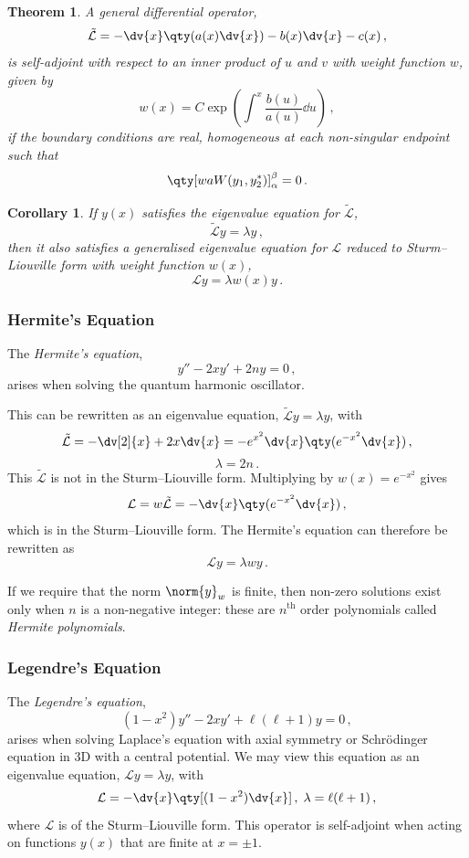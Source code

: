 \documentclass{article}
\theoremstyle{plain}\theoremheaderfont{\normalfont\itshape}\theorembodyfont{\rmfamily}\theoremseparator{.}\newtheorem*{rem}{Remark}\newtheorem*{ex}{Example}\newtheorem*{proof}{Proof}\newtheorem*{altp}{Alternative proof}
\theoremstyle{plain}\theoremheaderfont{\normalfont\bfseries}\theorembodyfont{\rmfamily}\theoremseparator{.}\newtheorem{thm}{Theorem}[section]\newtheorem{lem}[thm]{Lemma}\newtheorem{prop}[thm]{Proposition}\newtheorem*{cor}{Corollary}\newtheorem{defn}[thm]{Definition}\newtheorem{clm}[thm]{Claim}\newtheorem{clminproof}{Claim}
\theoremstyle{break}\theoremheaderfont{\normalfont\itshape}\theorembodyfont{\rmfamily}\theoremseparator{.\medskip}\newtheorem*{proofskip}{Proof}\newtheorem*{exs}{Examples}\newtheorem*{rems}{Remarks}
\theoremstyle{break}\theoremheaderfont{\normalfont\bfseries}\theorembodyfont{\rmfamily}\theoremseparator{.\medskip}\newtheorem{lemskip}[thm]{Lemma}\newtheorem{defnskip}[thm]{Definition}\newtheorem{propskip}[thm]{Proposition}\newtheorem{thmskip}[thm]{Theorem}
\numberwithin{equation}{section}
\begin{document}
	\begin{thm}
		A general differential operator,
		\[\tilde{\mathcal{L}}=-\dv{x}\qty(a(x)\dv{x})-b(x)\dv{x}-c(x)\,,\]
		is self-adjoint with respect to an inner product of \(u\) and \(v\) with weight function \(w\), given by
		\[w(x)=C\exp(\int^x \frac{b(u)}{a(u)}\dd{u})\,,\]
		if the boundary conditions are real, homogeneous at each non-singular endpoint such that
		\[\qty[waW(y_1,y_2^*)]_\alpha^\beta=0\,.\]
	\end{thm}

	\begin{cor}
		If \(y(x)\) satisfies the eigenvalue equation for \(\tilde{\mathcal{L}}\),
		\[\tilde{\mathcal{L}}y=\lambda y\,,\]
		then it also satisfies a generalised eigenvalue equation for \(\mathcal{L}\) reduced to Sturm--Liouville form with weight function \(w(x)\),
		\[\mathcal{L}y=\lambda w(x)y\,.\]
	\end{cor}
	\subsubsection{Hermite's Equation}
	The \textit{Hermite's equation},
	\[y''-2xy'+2ny=0\,,\]
	arises when solving the quantum harmonic oscillator.

	This can be rewritten as an eigenvalue equation, \(\tilde{\mathcal{L}}y=\lambda y\), with
	\[\tilde{\mathcal{L}}=-\dv[2]{x}+2x\dv{x}=-e^{x^2}\dv{x}\qty(e^{-x^2}\dv{x})\,,\]
	\[\lambda=2n\,.\]
	This \(\tilde{\mathcal{L}}\) is not in the Sturm--Liouville form. Multiplying by \(w(x)=e^{-x^2}\) gives
	\[\mathcal{L}=w\tilde{\mathcal{L}}=-\dv{x}\qty(e^{-x^2}\dv{x})\,,\]
	which is in the Sturm--Liouville form. The Hermite's equation can therefore be rewritten as
	\[\mathcal{L}y=\lambda wy\,.\]

	If we require that the norm \(\norm{y}_w\) is finite, then non-zero solutions exist only when \(n\) is a non-negative integer: these are \(n^\text{th}\) order polynomials called \textit{Hermite polynomials}.

	\subsubsection{Legendre's Equation}
	The \textit{Legendre's equation},
	\[(1-x^2)y''-2xy'+\ell(\ell+1)y=0\,,\]
	arises when solving Laplace's equation with axial symmetry or Schr\"{o}dinger equation in 3D with a central potential. We may view this equation as an eigenvalue equation, \(\mathcal{L}y=\lambda y\), with
	\[\mathcal{L}=-\dv{x}\qty[(1-x^2)\dv{x}]\,,\;\lambda=\ell(\ell+1)\,,\]
	where \(\mathcal{L}\) is of the Sturm--Liouville form. This operator is self-adjoint when acting on functions \(y(x)\) that are finite at \(x=\pm 1\).
\end{document}
